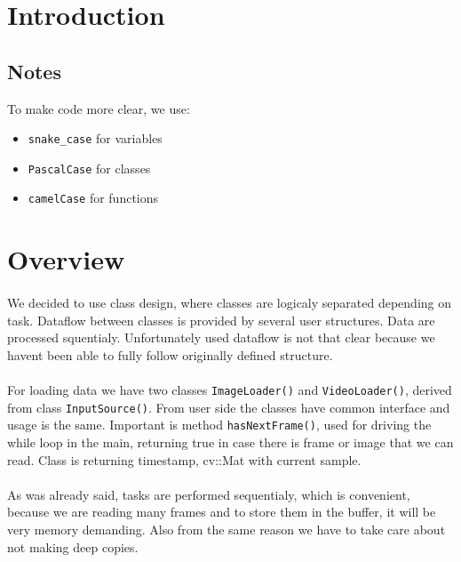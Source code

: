 \documentclass[english]{article}
\begin{document}
\tableofcontents
\newpage

\section{Introduction}

\subsection{Notes}
To make code more clear, we use:
\begin{itemize}
	\item \texttt{snake\_case} for variables
	\item \texttt{PascalCase} for classes
	\item \texttt{camelCase} for functions
\end{itemize}

\section{Overview}
\paragraph{}
We decided to use class design, where classes are logicaly separated depending on task.
Dataflow between classes is provided by several user structures. Data are processed squentialy.
Unfortunately used dataflow is not that clear because we havent been able to fully follow originally defined structure.
\paragraph{}
	For loading data we have two classes \texttt{ImageLoader()} and \texttt{VideoLoader()}, derived from class \texttt{InputSource()}.
	From user side the classes have common interface and usage is the same. Important is method \texttt{hasNextFrame()}, used for
	driving the while loop in the main, returning true in case there is frame or image that we can read. Class is returning timestamp,
	cv::Mat with current sample.

\paragraph{}
	As was already said, tasks are performed sequentialy, which is convenient, because we are reading many frames and to store them in the buffer,
	it will be very memory demanding. Also from the same reason we have to take care about not making deep copies.
\end{document}

